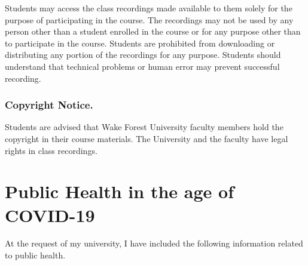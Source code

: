 Students may access the class recordings made available to them solely for the purpose of participating in the course. The recordings may not be used by any person other than a student enrolled in the course or for any purpose other than to participate in the course. Students are prohibited from downloading or distributing any portion of the recordings for any purpose. Students should understand that technical problems or human error may prevent successful recording.

\hypertarget{copyright-notice.}{%
\subsection{Copyright Notice.}\label{copyright-notice.}}

Students are advised that Wake Forest University faculty members hold the copyright in their course materials. The University and the faculty have legal rights in class recordings.

\hypertarget{public-health-in-the-age-of-covid-19}{%
\chapter{Public Health in the age of COVID-19}\label{public-health-in-the-age-of-covid-19}}

At the request of my university, I have included the following information related to public health.


